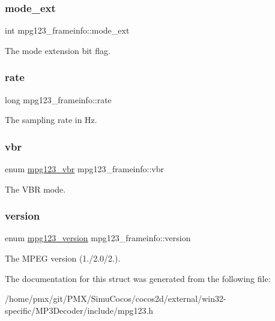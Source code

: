 \subsubsection{\texorpdfstring{mode\+\_\+ext}{mode\_ext}}
{\footnotesize\ttfamily int mpg123\+\_\+frameinfo\+::mode\+\_\+ext}

The mode extension bit flag. \mbox{\label{structmpg123__frameinfo_ab0e716a76ae87991e4607e5803da6899}} 
\subsubsection{\texorpdfstring{rate}{rate}}
{\footnotesize\ttfamily long mpg123\+\_\+frameinfo\+::rate}

The sampling rate in Hz. \mbox{\label{structmpg123__frameinfo_a48708817882f58b0a32c1e9db6e9fd74}} 
\subsubsection{\texorpdfstring{vbr}{vbr}}
{\footnotesize\ttfamily enum \hyperlink{group__mpg123__status_ga8253714e77705037271f377f33858876}{mpg123\+\_\+vbr} mpg123\+\_\+frameinfo\+::vbr}

The V\+BR mode. \mbox{\label{structmpg123__frameinfo_aa1276e21b0fd007148ac85b6290de057}} 
\subsubsection{\texorpdfstring{version}{version}}
{\footnotesize\ttfamily enum \hyperlink{group__mpg123__status_ga0553c78534d6d130df2d1dc0df675748}{mpg123\+\_\+version} mpg123\+\_\+frameinfo\+::version}

The M\+P\+EG version (1./2.0/2.). 

The documentation for this struct was generated from the following file\+:\begin{DoxyCompactItemize}
\item 
/home/pmx/git/\+P\+M\+X/\+Simu\+Cocos/cocos2d/external/win32-\/specific/\+M\+P3\+Decoder/include/mpg123.\+h\end{DoxyCompactItemize}
